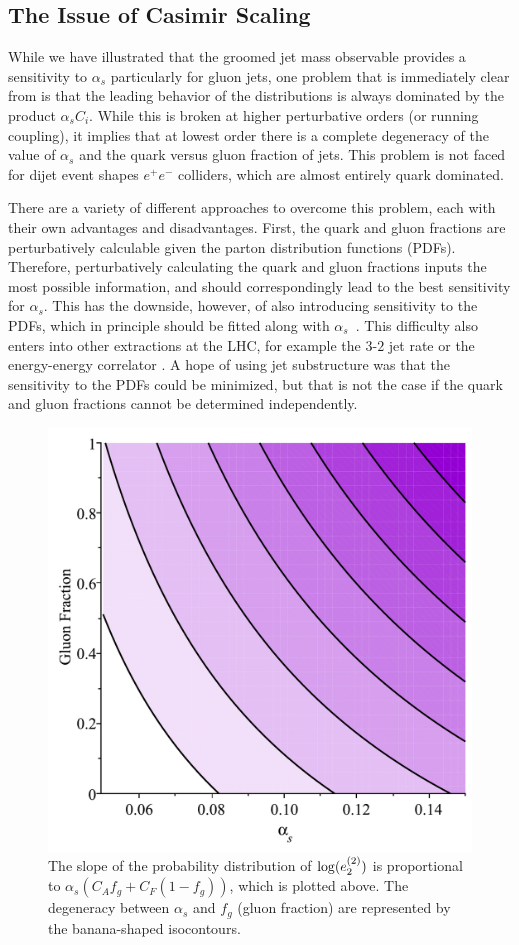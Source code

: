 \subsection{The Issue of Casimir Scaling}
\label{sec:casimir}

While we have illustrated that the groomed jet mass observable provides a sensitivity to $\alpha_s$ particularly for gluon jets, one problem that is immediately clear from  is that the leading behavior of the distributions is always dominated by the product $\alpha_s C_i$.
%
While this is broken at higher perturbative orders (or running coupling),  it implies that at lowest order there is a complete degeneracy of the value of $\alpha_s$ and the quark versus gluon fraction of jets.
%
This problem is not faced for dijet event shapes $e^+e^-$ colliders, which are almost entirely quark dominated.

There are a variety of different approaches to overcome this problem, each with their own advantages and disadvantages.
%
First, the quark and gluon fractions are perturbatively calculable given the parton distribution functions (PDFs).
%
Therefore, perturbatively calculating the quark and gluon fractions inputs the most possible information, and should correspondingly lead to the best sensitivity for $\alpha_s$.
%
This has the downside, however, of also introducing sensitivity to the PDFs, which in principle should be fitted along with $\alpha_s$~\cite{Accardi:2016ndt}.
%
This difficulty also enters into other extractions at the LHC, for example the $3$-$2$ jet rate  or the energy-energy correlator .
%
A hope of using jet substructure was that the sensitivity to the PDFs could be minimized, but that is not the case if the quark and gluon fractions cannot be determined independently.

\begin{figure}[t]
\begin{center}
\includegraphics[width = 0.4\columnwidth]{figures/Degeneracy}
\end{center}
\caption{The slope of the probability distribution of $\log(e_{2}^{(2)})$ is proportional to $\alpha_s(C_Af_g+C_F(1-f_g))$, which is plotted above.  The degeneracy between $\alpha_s$ and $f_g$ (gluon fraction) are represented by the banana-shaped isocontours. }
\label{fig:analyticbanana}
\end{figure}

